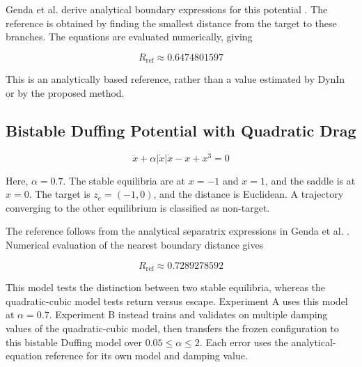 Genda et al. derive analytical boundary expressions for this potential \cite[Sections 3.5--3.6]{ref13}. The reference is obtained by finding the smallest distance from the target to these branches. The equations are evaluated numerically, giving

\begin{equation}
  {R}_{\mathrm{ref}} \approx  0.6474801597
\end{equation}

This is an analytically based reference, rather than a value estimated by DynIn or by the proposed method.

\subsection{Bistable Duffing Potential with Quadratic Drag}

\begin{equation}
  \ddot{x} + \alpha |\dot{x}|\dot{x} - x + {x}^{3} = 0
\end{equation}

\begin{revision}
Here, $\alpha =0.7$. The stable equilibria are at $x=-1$ and $x=1$, and the saddle is at $x=0$. The target is ${z}_{e}=(-1,0)$, and the distance is Euclidean. A trajectory converging to the other equilibrium is classified as non-target.
\end{revision}

The reference follows from the analytical separatrix expressions in Genda et al. \cite[Section 4.5]{ref13}. Numerical evaluation of the nearest boundary distance gives

\begin{equation}
  {R}_{\mathrm{ref}} \approx  0.7289278592
\end{equation}

\begin{bluerevision}
\begin{greenrevision}
This model tests the distinction between two stable equilibria, whereas the quadratic-cubic model tests return versus escape. Experiment A uses this model at $\alpha=0.7$. Experiment B instead trains and validates on multiple damping values of the quadratic-cubic model, then transfers the frozen configuration to this bistable Duffing model over $0.05\leq\alpha\leq2$. Each error uses the analytical-equation reference for its own model and damping value.
\end{greenrevision}
\end{bluerevision}

